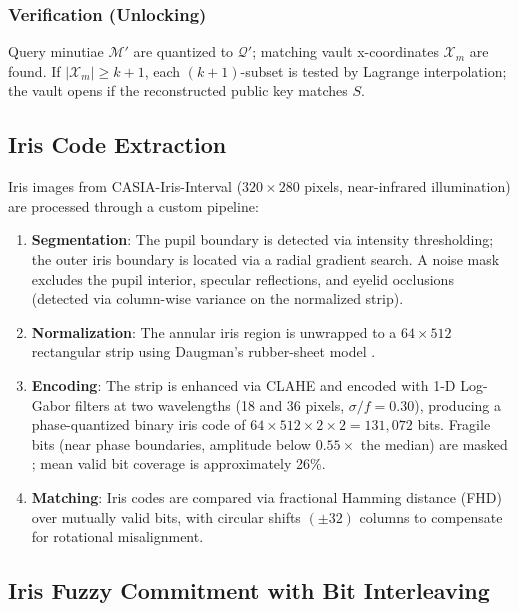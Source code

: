 \subsubsection{Verification (Unlocking)}
Query minutiae $\mathcal{M}'$ are quantized to $\mathcal{Q}'$; matching vault
x-coordinates $\mathcal{X}_m$ are found. If $|\mathcal{X}_m| \geq k{+}1$, each
$(k{+}1)$-subset is tested by Lagrange interpolation; the vault opens if the
reconstructed public key matches $S$.

\subsection{Iris Code Extraction}
\label{sec:iris_extract_prelim}

Iris images from CASIA-Iris-Interval ($320 \times 280$ pixels, near-infrared
illumination) are processed through a custom pipeline:

\begin{enumerate}
  \item \textbf{Segmentation}: The pupil boundary is detected via intensity
  thresholding; the outer iris boundary is located via a radial gradient search.
  A noise mask excludes the pupil interior, specular reflections, and eyelid
  occlusions (detected via column-wise variance on the normalized strip).

  \item \textbf{Normalization}: The annular iris region is unwrapped to a
  $64 \times 512$ rectangular strip using Daugman's rubber-sheet model
  \cite{daugman2004how}.

  \item \textbf{Encoding}: The strip is enhanced via CLAHE and encoded with 1-D
  Log-Gabor filters at two wavelengths (18 and 36 pixels, $\sigma/f = 0.30$),
  producing a phase-quantized binary iris code of
  $64 \times 512 \times 2 \times 2 = 131{,}072$ bits.
  Fragile bits (near phase boundaries, amplitude below $0.55\times$ the median)
  are masked \cite{hollingsworth2009fragile}; mean valid bit coverage is
  approximately 26\%.

  \item \textbf{Matching}: Iris codes are compared via fractional Hamming distance
  (FHD) over mutually valid bits, with circular shifts $(\pm 32)$ columns to
  compensate for rotational misalignment.
\end{enumerate}

\subsection{Iris Fuzzy Commitment with Bit Interleaving}
\label{sec:iris_commit_prelim}

